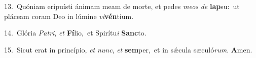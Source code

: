 {\numbfont\textcolor{\numbcolor}{13.}}~Quóniam eripuísti ánimam meam de morte, et pedes \textit{me}\-\textit{os} \textit{de} \textbf{lap}\-su:~\star ut pláceam coram Deo in lúmine \textit{vi}\-\textbf{vén}tium.\par
{\numbfont\textcolor{\numbcolor}{14.}}~Glória \textit{Pa}\-\textit{tri}, \textit{et} \textbf{Fí}\-lio,~\star et Spirítu\textit{i} \textbf{Sanc}\-to.\par
{\numbfont\textcolor{\numbcolor}{15.}}~Sicut erat in princípio, \textit{et} \textit{nunc}\-, \textit{et} \textbf{sem}\-per,~\star et in sǽcula sæculó\-\textit{rum}\-. \textbf{A}\-men.\par
